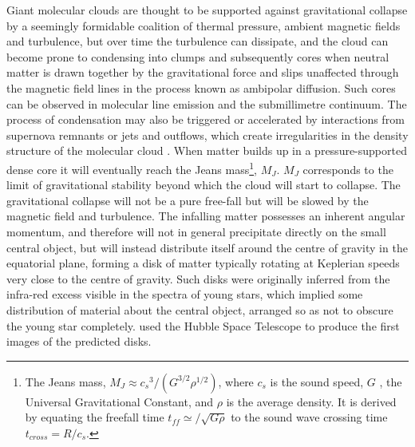 Giant molecular clouds are thought to be supported against gravitational
collapse by a seemingly formidable coalition of
thermal pressure, ambient magnetic fields and turbulence, but over time the turbulence can
dissipate, and the cloud can become prone to condensing into clumps and
subsequently cores when
neutral matter is drawn together by the gravitational force and slips unaffected
through the magnetic field lines in the process known as ambipolar diffusion. 
Such cores can be observed in molecular line emission and the submillimetre continuum.
The process of
condensation may also be triggered or accelerated by interactions from supernova
remnants or jets and outflows, which create irregularities in the density
structure of the molecular cloud \citep{1997MNRAS.285..201B}.
When matter builds up in a pressure-supported dense core it will
eventually reach the Jeans mass\footnote{
 The Jeans mass, $M_J \approx {c_s}^3 / \left( G^{3/2} {\rho}^{1/2} \right)$, where $c_s$ is the sound speed, $G$ , the Universal Gravitational Constant, and $\rho$ is the average density.
It is derived by equating the freefall time $t_{ff} \simeq /\sqrt{G\rho} $ to the sound wave crossing time $t_{cross}=R/c_s$.
}, $M_J$. 
$M_J$ corresponds to the limit of gravitational stability beyond
which the cloud will start to collapse.
The gravitational collapse will not be a pure free-fall but will be slowed by the magnetic field
and turbulence.
The infalling matter possesses an inherent angular momentum, and therefore will not in general precipitate directly on the small central
object, but will instead distribute itself around
the centre of gravity in the equatorial plane, forming a disk of matter typically rotating
at Keplerian speeds very close to the centre of gravity.
Such disks were originally inferred from the infra-red excess visible in the
spectra of young stars, which implied some distribution of material about the
central object, arranged so as not to obscure the young star completely. \citet{1993ApJ...410..696O} used the Hubble Space Telescope to produce the first images of the predicted disks.



